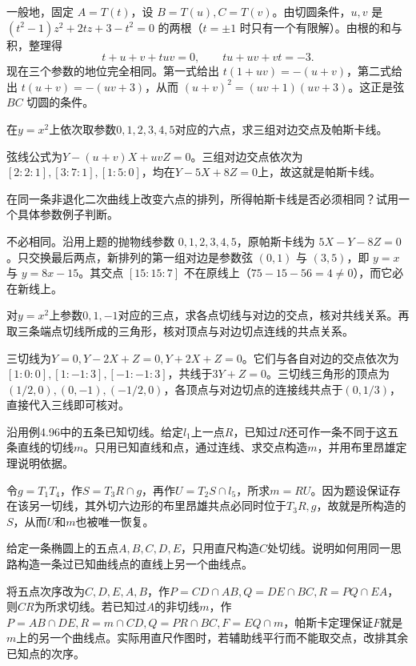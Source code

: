 一般地，固定 \(A=T(t)\)，设 \(B=T(u),C=T(v)\)。由切圆条件，\(u,v\) 是 \((t^2-1)z^2+2tz+3-t^2=0\) 的两根（\(t=\pm1\) 时只有一个有限解）。由根的和与积，整理得
\[
 t+u+v+tuv=0,\qquad tu+uv+vt=-3.
\]
现在三个参数的地位完全相同。第一式给出 \(t(1+uv)=-(u+v)\)，第二式给出 \(t(u+v)=-(uv+3)\)，从而 \((u+v)^2=(uv+1)(uv+3)\)。这正是弦 \(BC\) 切圆的条件。


在\(y=x^2\)上依次取参数\(0,1,2,3,4,5\)对应的六点，求三组对边交点及帕斯卡线。
\par
\solutionanswer
弦线公式为\(Y-(u+v)X+uvZ=0\)。三组对边交点依次为\([2:2:1],[3:7:1],[1:5:0]\)，均在\(Y-5X+8Z=0\)上，故这就是帕斯卡线。


在同一条非退化二次曲线上改变六点的排列，所得帕斯卡线是否必须相同？试用一个具体参数例子判断。
\par
\solutionanswer
不必相同。沿用上题的抛物线参数 \(0,1,2,3,4,5\)，原帕斯卡线为 \(5X-Y-8Z=0\)。只交换最后两点，新排列的第一组对边是参数弦 \((0,1)\) 与 \((3,5)\)，即 \(y=x\) 与 \(y=8x-15\)。其交点 \([15:15:7]\) 不在原线上（\(75-15-56=4\ne0\)），而它必在新线上。


对\(y=x^2\)上参数\(0,1,-1\)对应的三点，求各点切线与对边的交点，核对共线关系。再取三条端点切线所成的三角形，核对顶点与对边切点连线的共点关系。
\par
\solutionanswer
三切线为\(Y=0,Y-2X+Z=0,Y+2X+Z=0\)。它们与各自对边的交点依次为\([1:0:0],[1:-1:3],[-1:-1:3]\)，共线于\(3Y+Z=0\)。三切线三角形的顶点为\((1/2,0),(0,-1),(-1/2,0)\)，各顶点与对边切点的连接线共点于\((0,1/3)\)，直接代入三线即可核对。


沿用例4.96中的五条已知切线。给定\(l_1\)上一点\(R\)，已知过\(R\)还可作一条不同于这五条直线的切线\(m\)。只用已知直线和点，通过连线、求交点构造\(m\)，并用布里昂雄定理说明依据。
\par
\solutionanswer
令\(g=T_1T_4\)，作\(S=T_3R\cap g\)，再作\(U=T_2S\cap l_5\)，所求\(m=RU\)。因为题设保证存在该另一切线，其外切六边形的布里昂雄共点必同时位于\(T_3R,g\)，故就是所构造的\(S\)，从而\(U\)和\(m\)也被唯一恢复。


给定一条椭圆上的五点\(A,B,C,D,E\)，只用直尺构造\(C\)处切线。说明如何用同一思路构造一条过已知曲线点的直线上另一个曲线点。
\par
\solutionanswer
将五点次序改为\(C,D,E,A,B\)，作\(P=CD\cap AB,Q=DE\cap BC,R=PQ\cap EA\)，则\(CR\)为所求切线。若已知过\(A\)的非切线\(m\)，作\(P=AB\cap DE,R=m\cap CD,Q=PR\cap BC,F=EQ\cap m\)，帕斯卡定理保证\(F\)就是\(m\)上的另一个曲线点。实际用直尺作图时，若辅助线平行而不能取交点，改排其余已知点的次序。


